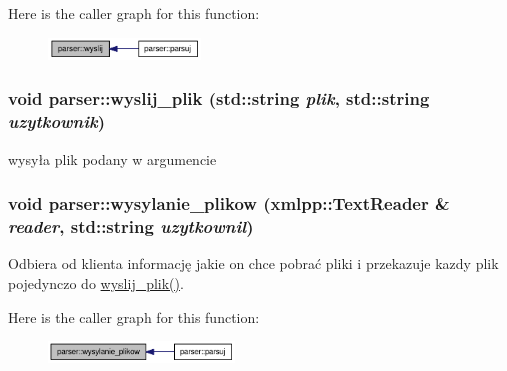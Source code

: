 Here is the caller graph for this function:\nopagebreak
\begin{figure}[H]
\begin{center}
\leavevmode
\includegraphics[width=115pt]{dd/dad/a00005_2f6aceaa94a28fc699e4f824f7622b51_icgraph}
\end{center}
\end{figure}
\hypertarget{a00005_771537f72f9e6a9cdb1d2961828eb66b}{
\subsubsection[{wyslij\_\-plik}]{\setlength{\rightskip}{0pt plus 5cm}void parser::wyslij\_\-plik (std::string {\em plik}, \/  std::string {\em uzytkownik})}}
\label{dd/dad/a00005_771537f72f9e6a9cdb1d2961828eb66b}


wysyła plik podany w argumencie 

\hypertarget{a00005_cc293df6220f5030fab5a7ee9cf8b1fa}{
\subsubsection[{wysylanie\_\-plikow}]{\setlength{\rightskip}{0pt plus 5cm}void parser::wysylanie\_\-plikow (xmlpp::TextReader \& {\em reader}, \/  std::string {\em uzytkownil})}}
\label{dd/dad/a00005_cc293df6220f5030fab5a7ee9cf8b1fa}


Odbiera od klienta informację jakie on chce pobrać pliki i przekazuje kazdy plik pojedynczo do \hyperlink{a00005_771537f72f9e6a9cdb1d2961828eb66b}{wyslij\_\-plik()}. 



Here is the caller graph for this function:\nopagebreak
\begin{figure}[H]
\begin{center}
\leavevmode
\includegraphics[width=140pt]{dd/dad/a00005_cc293df6220f5030fab5a7ee9cf8b1fa_icgraph}
\end{center}
\end{figure}


